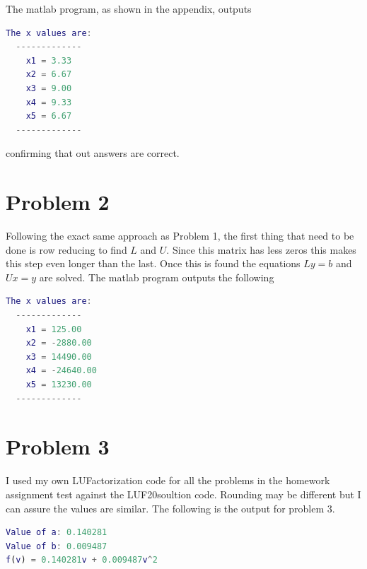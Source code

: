 \documentclass[12pt]{article}
\begin{document}
The matlab program, as shown in the appendix, outputs 

\begin{center}
\begin{lstlisting}[language=Matlab, caption=LU Factor Output]
The x values are:
  -------------  
    x1 = 3.33  
    x2 = 6.67  
    x3 = 9.00  
    x4 = 9.33  
    x5 = 6.67  
  ------------- 
\end{lstlisting}
\end{center}

confirming that out answers are correct.

\newpage

\section*{Problem 2}

Following the exact same approach as Problem 1, the first thing that need to be done is row reducing to find $L$ and $U$. Since this matrix has less zeros this makes this step even longer than the last. Once this is found the equations $Ly = b$ and $Ux = y$ are solved. The matlab program outputs the following

\begin{lstlisting}[language=Matlab, caption=LU Factor Output]
The x values are:
  -------------  
    x1 = 125.00  
    x2 = -2880.00  
    x3 = 14490.00  
    x4 = -24640.00  
    x5 = 13230.00  
  -------------  
 \end{lstlisting}
  
\newpage
  
\section*{Problem 3}

I used my own LUFactorization code for all the problems in the homework assignment test against the LUF20soultion code. Rounding may be different but I can assure the values are similar. The following is the output for problem 3.

\begin{lstlisting}[language=Matlab, caption=General Least Squares Output]
Value of a: 0.140281 
Value of b: 0.009487 
f(v) = 0.140281v + 0.009487v^2 
\end{lstlisting}
\end{document}
